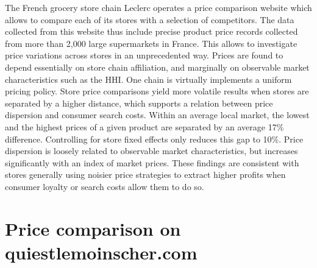 \documentclass[english]{article}
\begin{document}
The French grocery store chain Leclerc operates a price comparison website which allows to compare each of its stores with a selection of competitors. The data collected from this website thus include precise product price records collected from more than 2,000 large supermarkets in France. This allows to investigate price variations across stores in an unprecedented way. Prices are found to depend essentially on store chain affiliation, and marginally on observable market characteristics such as the HHI. One chain is virtually implements a uniform pricing policy. Store price comparisons yield more volatile results when stores are separated by a higher distance, which supports a relation between price dispersion and consumer search costs. Within an average local market, the lowest and the highest prices of a given product are separated by an average 17\% difference. Controlling for store fixed effects only reduces this gap to 10\%. Price dispersion is loosely related to observable market characteristics, but increases significantly with an index of market prices. These findings are consistent with stores generally using noisier price strategies to extract higher profits when consumer loyalty or search costs allow them to do so.

\section{Price comparison on quiestlemoinscher.com}
\end{document}
